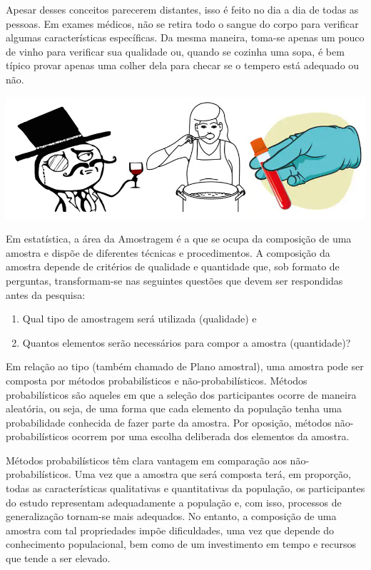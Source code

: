 \documentclass[
]{book}
\providecommand{\tightlist}{%
  \setlength{\itemsep}{0pt}\setlength{\parskip}{0pt}}
\begin{document}
Apesar desses conceitos parecerem distantes, isso é feito no dia a dia
de todas as pessoas. Em exames médicos, não se retira todo o sangue do
corpo para verificar algumas características específicas. Da mesma
maneira, toma-se apenas um pouco de vinho para verificar sua qualidade
ou, quando se cozinha uma sopa, é bem típico provar apenas uma colher
dela para checar se o tempero está adequado ou não.

\includegraphics{./img/cap_amostra_desenhos.png}

Em estatística, a área da Amostragem é a que se ocupa da composição de
uma amostra e dispõe de diferentes técnicas e procedimentos. A
composição da amostra depende de critérios de qualidade e quantidade
que, sob formato de perguntas, transformam-se nas seguintes questões que
devem ser respondidas antes da pesquisa:

\begin{enumerate}
\def\labelenumi{\arabic{enumi})}
\tightlist
\item
  Qual tipo de amostragem será utilizada (qualidade) e\\
\item
  Quantos elementos serão necessários para compor a amostra
  (quantidade)?
\end{enumerate}

Em relação ao tipo (também chamado de Plano amostral), uma amostra pode
ser composta por métodos probabilísticos e não-probabilísticos. Métodos
probabilísticos são aqueles em que a seleção dos participantes ocorre de
maneira aleatória, ou seja, de uma forma que cada elemento da população
tenha uma probabilidade conhecida de fazer parte da amostra. Por
oposição, métodos não-probabilísticos ocorrem por uma escolha deliberada
dos elementos da amostra.

Métodos probabilísticos têm clara vantagem em comparação aos
não-probabilísticos. Uma vez que a amostra que será composta terá, em
proporção, todas as características qualitativas e quantitativas da
população, os participantes do estudo representam adequadamente a
população e, com isso, processos de generalização tornam-se mais
adequados. No entanto, a composição de uma amostra com tal propriedades
impõe dificuldades, uma vez que depende do conhecimento populacional,
bem como de um investimento em tempo e recursos que tende a ser elevado.
\end{document}
